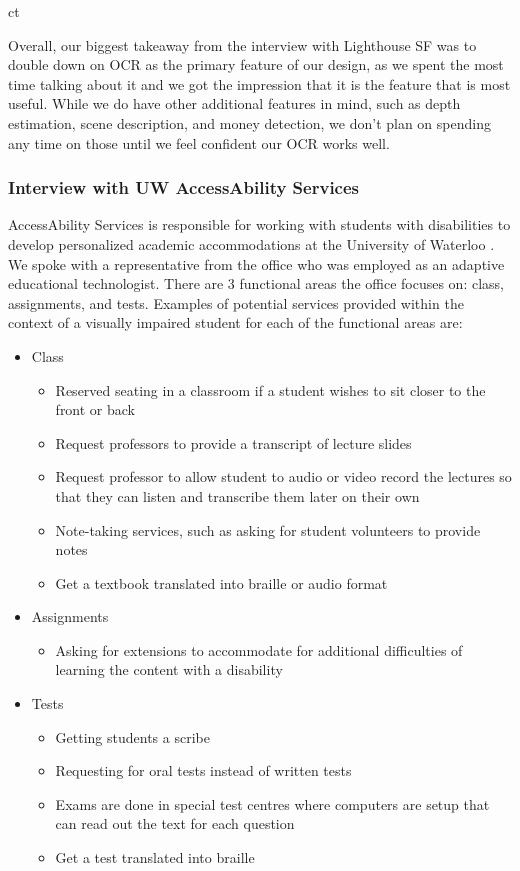 ct\documentclass[a4paper,11pt]{article}
\begin{document}
Overall, our biggest takeaway from the interview with Lighthouse SF was to double down on OCR as the primary feature of our design, as we spent the most time talking about it and we got the impression that it is the feature that is most useful. While we do have other additional features in mind, such as depth estimation, scene description, and money detection, we don't plan on spending any time on those until we feel confident our OCR works well.

\subsubsection{Interview with UW AccessAbility Services}
AccessAbility Services is responsible for working with students with disabilities to develop personalized academic accommodations at the University of Waterloo \cite{uw-accessability}. We spoke with a representative from the office who was employed as an adaptive educational technologist. There are 3 functional areas the office focuses on: class, assignments, and tests. Examples of potential services provided within the context of a visually impaired student for each of the functional areas are:
\begin{itemize}
    \item Class
    \begin{itemize}
        \item Reserved seating in a classroom if a student wishes to sit closer to the front or back
        \item Request professors to provide a transcript of lecture slides
        \item Request professor to allow student to audio or video record the lectures so that they can listen and transcribe them later on their own
        \item Note-taking services, such as asking for student volunteers to provide notes
        \item Get a textbook translated into braille or audio format
    \end{itemize}
    
    \item Assignments
    \begin{itemize}
        \item Asking for extensions to accommodate for additional difficulties of learning the content with a disability
    \end{itemize}
    
    \item Tests
    \begin{itemize}
        \item Getting students a scribe
        \item Requesting for oral tests instead of written tests
        \item Exams are done in special test centres where computers are setup that can read out the text for each question
        \item Get a test translated into braille
    \end{itemize}
\end{itemize}
\end{document}
